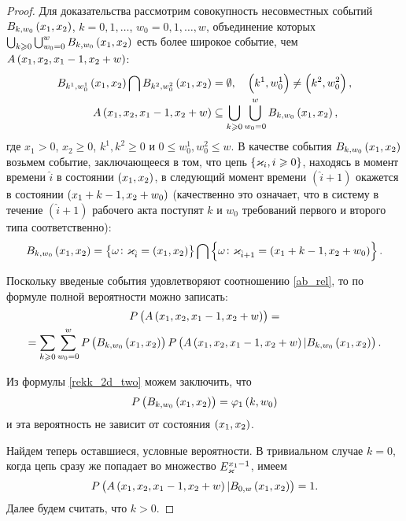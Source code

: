 \documentclass[a4paper,14pt,russian]{article}
\newcommand{\Markk}[0]{\brrr{ \vk_i, i \geqslant 0}}
\begin{document}
\begin{proof}
Для доказательства рассмотрим совокупность несовместных событий $B_{k,w_0}\left(x_1,x_2\right)$, $k = 0, 1, \ldots$, $w_0 = 0, 1, \ldots, w$, объединение которых 
$\bigcup_{k\geqslant 0} \bigcup_{w_0 = 0}^{w} B_{k,w_0}\left(x_1,x_2\right)$ есть более широкое событие, чем $A\left(x_1,x_2,x_1-1,x_2+w\right)$:
\begin{align}
B_{k^1, w_0^1} \left(x_1,x_2\right) \bigcap B_{k^2, w_0^2} \left(x_1,x_2\right) &= \emptyset, \quad \left(k^1, w_0^1\right) \neq \left(k^2, w_0^2\right), \\
A\left(x_1,x_2,x_1-1,x_2+w\right) &\subseteq \bigcup_{k\geqslant 0} \bigcup_{w_0 = 0}^{w} B_{k,w_0}\left(x_1,x_2\right),
\label{ab_rel}
\end{align}
где $x_1 >0$, $x_2 \geqslant 0$, $k^1,k^2 \geqslant 0$ и $0 \leqslant w_0^1, w_0^2 \leqslant w$.
В качестве события $B_{k,w_0}\left(x_1,x_2\right)$ возьмем событие, заключающееся в том,
что цепь $\Markk$, находясь в момент времени $\hat{i}$ в состоянии $\left(x_1,x_2\right)$, в следующий момент времени $(\hat{i}+1)$ окажется в состоянии $\left(x_1 + k - 1,x_2 + w_0\right)$ 
(качественно это означает, что в систему в течение $(\hat{i}+1)$ рабочего акта поступят $k$ и $w_0$ требований первого и второго типа соответственно):
\begin{equation*}
 B_{k,w_0}\left(x_1,x_2\right) = \left\{\omega \colon \varkappa_{\hat{i}} = \left(x_1,x_2\right)\right\} \bigcap \left\{\omega \colon  \varkappa_{\hat{i}+1} = \left(x_1 + k - 1, x_2 + w_0\right)\right\}.
\end{equation*}

Поскольку введеные события удовлетворяют соотношению \eqref{ab_rel}, то по формуле полной вероятности можно записать:
\begin{multline}
 P\left(A\left(x_1,x_2,x_1-1,x_2+w\right)\right) = \\ = \sum_{k\geqslant 0} \sum_{w_0 = 0}^{w} P\left(B_{k,w_0}\left(x_1,x_2\right)\right) P\left(A\left(x_1,x_2,x_1-1,x_2+w\right)|B_{k,w_0}\left(x_1,x_2\right)\right).
 \label{addition_prob_one}
\end{multline}

Из формулы \eqref{rekk_2d_two} можем заключить, что  
\begin{equation}
 P\left(B_{k,w_0}\left(x_1,x_2\right)\right) = \varphi_1\left(k,w_0\right)
 \label{addition_prob_two}
 \end{equation}
и эта вероятность не зависит от состояния $\left(x_1,x_2\right)$. 

Найдем теперь оставшиеся, условные вероятности. В тривиальном случае $k=0$, когда цепь сразу же попадает во множество $E_{\varkappa}^{x_1-1}$, имеем
\begin{equation}
 P\left(A\left(x_1,x_2,x_1-1,x_2+w\right)|B_{0,w}\left(x_1,x_2\right)\right) = 1.
 \label{addition_prob_two_one}
\end{equation}
Далее будем считать, что $k>0$.


\end{proof}
\end{document}
